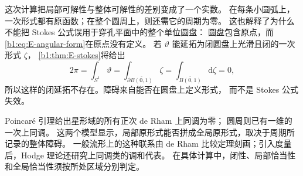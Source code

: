 这次计算把局部可解性与整体可解性的差别变成了一个实数。
在每条小圆弧上，一次形式都有原函数；在整个圆周上，则还需它的周期为零。
这也解释了为什么不能把 Stokes 公式误用于穿孔平面中的整个单位圆盘：
圆盘包含原点，而\eqref{b1:eq:E-angular-form}在原点没有定义。
若 \(\vartheta\) 能延拓为闭圆盘上光滑且闭的一次形式 \(\zeta\)，
\cref{b1:thm:E-stokes}将给出
\[
 2\pi=\int_{S^1}\vartheta
      =\int_{\partial\overline{B(0,1)}}\zeta
      =\int_{\overline{B(0,1)}}\mathrm d\zeta=0,
\]
所以这样的闭延拓不存在。障碍来自能否在圆盘上定义形式，
而不是 Stokes 公式失效。

\ProseParagraphBreak

Poincaré 引理给出星形域的所有正次 de Rham 上同调为零；
圆周则已有一维的一次上同调。
这两个模型显示，局部原形式能否拼成全局原形式，取决于周期所记录的整体障碍。
一般流形上的这种联系由 de Rham 比较定理刻画；引入度量后，Hodge 理论还研究上同调类的调和代表。
在具体计算中，闭性、局部恰当性和全局恰当性须按所处区域分别判定。
